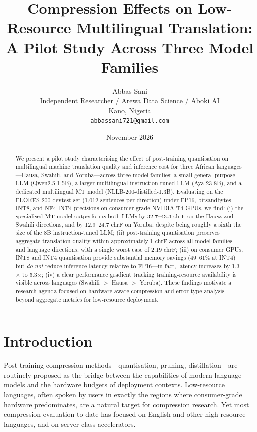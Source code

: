 \documentclass[11pt,a4paper]{article}
\title{\textbf{Compression Effects on Low-Resource Multilingual
Translation:\\ A Pilot Study Across Three Model Families}}
\author{Abbas Sani\\
\small Independent Researcher / Arewa Data Science / Aboki AI\\
\small Kano, Nigeria\\
\small \texttt{abbassani721@gmail.com}}
\date{November 2026}
\begin{document}
\maketitle

\begin{abstract}
We present a pilot study characterising the effect of post-training
quantisation on multilingual machine translation quality and inference
cost for three African languages---Hausa, Swahili, and Yoruba---across
three model families: a small general-purpose LLM (Qwen2.5-1.5B), a
larger multilingual instruction-tuned LLM (Aya-23-8B), and a dedicated
multilingual MT model (NLLB-200-distilled-1.3B). Evaluating on the
FLORES-200 devtest set (1{,}012 sentences per direction) under FP16,
bitsandbytes INT8, and NF4 INT4 precisions on consumer-grade NVIDIA T4
GPUs, we find: (i) the specialised MT model outperforms both LLMs by
32.7--43.3 chrF on the Hausa and Swahili directions, and by 12.9--24.7
chrF on Yoruba, despite being roughly a sixth the size of the 8B
instruction-tuned LLM; (ii) post-training quantisation preserves
aggregate translation quality within approximately 1 chrF across all
model families and language directions, with a single worst case of
2.19 chrF; (iii) on consumer GPUs, INT8 and INT4 quantisation provide
substantial memory savings (49--61\% at INT4) but \emph{do not} reduce
inference latency relative to FP16---in fact, latency increases by
1.3$\times$ to 5.3$\times$; (iv) a clear performance gradient tracking
training-resource availability is visible across languages
(Swahili $>$ Hausa $>$ Yoruba). These findings motivate a research
agenda focused on hardware-aware compression and error-type analysis
beyond aggregate metrics for low-resource deployment.
\end{abstract}

\section{Introduction}

Post-training compression methods---quantisation, pruning,
distillation---are routinely proposed as the bridge between the
capabilities of modern language models and the hardware budgets of
deployment contexts. Low-resource languages, often spoken by users in
exactly the regions where consumer-grade hardware predominates, are a
natural target for compression research. Yet most compression
evaluation to date has focused on English and other high-resource
languages, and on server-class accelerators.
\end{document}
